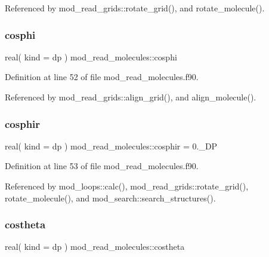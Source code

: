 Referenced by mod\+\_\+read\+\_\+grids\+::rotate\+\_\+grid(), and rotate\+\_\+molecule().

\mbox{\label{namespacemod__read__molecules_aa56e64086c25d032f85b2528c2dfc698}} 
\subsubsection{\texorpdfstring{cosphi}{cosphi}}
{\footnotesize\ttfamily real( kind = dp ) mod\+\_\+read\+\_\+molecules\+::cosphi}



Definition at line 52 of file mod\+\_\+read\+\_\+molecules.\+f90.



Referenced by mod\+\_\+read\+\_\+grids\+::align\+\_\+grid(), and align\+\_\+molecule().

\mbox{\label{namespacemod__read__molecules_a169468a3161d2d2e074c0acacf22289a}} 
\subsubsection{\texorpdfstring{cosphir}{cosphir}}
{\footnotesize\ttfamily real( kind = dp ) mod\+\_\+read\+\_\+molecules\+::cosphir = 0.\+\_\+\+DP}



Definition at line 53 of file mod\+\_\+read\+\_\+molecules.\+f90.



Referenced by mod\+\_\+loops\+::calc(), mod\+\_\+read\+\_\+grids\+::rotate\+\_\+grid(), rotate\+\_\+molecule(), and mod\+\_\+search\+::search\+\_\+structures().

\mbox{\label{namespacemod__read__molecules_aecec9abde85a75891e653ded1997b267}} 
\subsubsection{\texorpdfstring{costheta}{costheta}}
{\footnotesize\ttfamily real( kind = dp ) mod\+\_\+read\+\_\+molecules\+::costheta}



